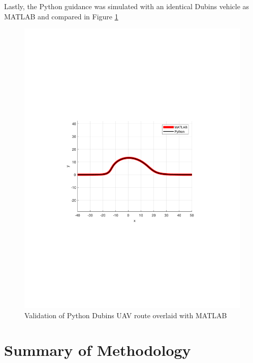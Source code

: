 \documentclass[numbered,pdftex]{ohio-etd}
\begin{document}
Lastly, the Python guidance was simulated with an identical Dubins vehicle as MATLAB and compared in Figure \ref{fig:pythonMATDubins}

\begin{figure}[H]
	\centering
	\includegraphics[trim=0 230 0 260,clip,width=16cm]{PaperFigures/Methods/resultsPython/dubinsPaths}
	\caption{Validation of Python Dubins UAV route overlaid with MATLAB}
	\label{fig:pythonMATDubins}
\end{figure}



\section{Summary of Methodology}
\end{document}
